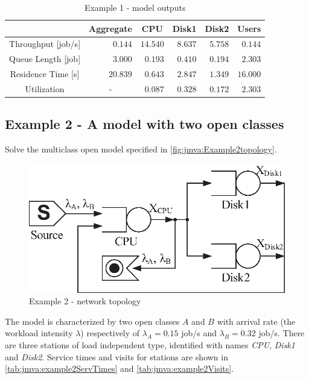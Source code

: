 \begin{table}[htbp]
\begin{center}
\begin{tabular}{c|r|r|r|r|r|}
& \multicolumn{1}{c|}{Aggregate} & \multicolumn{1}{c|}{CPU} & \multicolumn{1}{c|}{Disk1} & \multicolumn{1}{c|}{Disk2} & \multicolumn{1}{c|}{Users}\\
\hline
Throughput [job/s]& $0.144$ & $14.540$ & $8.637$ & $5.758$ & $0.144$\\
Queue Length [job]& $3.000$ & $0.193$ & $0.410$ & $0.194$ & $2.303$\\
Residence Time [s]& $20.839$ & $0.643$ & $2.847$ & $1.349$ & $16.000$\\
Utilization & \multicolumn{1}{c|}{-} & $0.087$ & $0.328$ & $0.172$ & $2.303$\\
\hline
\end{tabular}
\end{center}
\caption{Example 1 - model outputs} \label{tab:jmva:example1results}
\end{table}


\subsection{Example 2 - A model with two open classes}
\label{sec:jmva:example2} Solve the multiclass open model specified
in \autoref{fig:jmva:Example2topology}.
\begin{figure}[htbp]
    \begin{center}
        \includegraphics[scale=.65]{img/jmva/example2}
    \end{center}
    \caption{Example 2 - network topology}
    \label{fig:jmva:Example2topology}
\end{figure}
The model is characterized by two open classes $A$ and $B$ with
arrival rate (the workload intensity $\lambda$) respectively of
$\lambda_A = 0.15$ job/s and $\lambda_B=0.32$ job/s. There are three
stations of load independent type, identified with names \emph{CPU},
\emph{Disk1} and \emph{Disk2}. Service times and visits for stations
are shown in \autoref{tab:jmva:example2ServTimes} and
\autoref{tab:jmva:example2Visits}.


